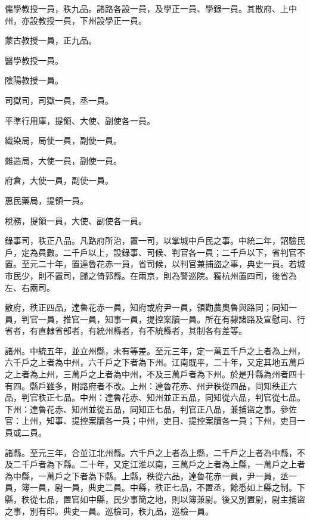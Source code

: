 \begin{pinyinscope}
 儒學教授一員，秩九品。諸路各設一員，及學正一員、學錄一員。其散府、上中州，亦設教授一員，下州設學正一員。



 蒙古教授一員，正九品。



 醫學教授一員。



 陰陽教授一員。



 司獄司，司獄一員，丞一員。



 平準行用庫，提領、大使、副使各一員。



 織染局，局使一員，副使一員。



 雜造局，大使一員，副使一員。



 府倉，大使一員，副使一員。



 惠民藥局，提領一員。



 稅務，提領一員，大使、副使各一員。



 錄事司，秩正八品。凡路府所治，置一司，以掌城中戶民之事。中統二年，詔驗民戶，定為員數。二千戶以上，設錄事、司候、判官各一員；二千戶以下，省判官不置。至元二十年，置達魯花赤一員，省司候，以判官兼捕盜之事，典史一員。若城市民少，則不置司，歸之倚郭縣。在兩京，則為警巡院。獨杭州置四司，後省為左、右兩司。



 散府，秩正四品，達魯花赤一員，知府或府尹一員，領勸農奧魯與路同；同知一員，判官一員，推官一員，知事一員，提控案牘一員。所在有隸諸路及宣慰司、行省者，有直隸省部者，有統州縣者，有不統縣者，其制各有差等。



 諸州。中統五年，並立州縣，未有等差。至元三年，定一萬五千戶之上者為上州，六千戶之上者為中州，六千戶之下者為下州。江南既平，二十年，又定其地五萬戶之上者為上州，三萬戶之上者為中州，不及三萬戶者為下州。於是升縣為州者四十有四。縣戶雖多，附路府者不改。上州：達魯花赤、州尹秩從四品，同知秩正六品，判官秩正七品。中州：達魯花赤、知州並正五品，同知從六品，判官從七品。下州：達魯花赤、知州並從五品，同知正七品，判官正八品，兼捕盜之事。參佐官：上州，知事、提控案牘各一員；中州，吏目、提控案牘各一員；下州，吏目一員或二員。



 諸縣。至元三年，合並江北州縣。六千戶之上者為上縣，二千戶之上者為中縣，不及二千戶者為下縣。二十年，又定江淮以南，三萬戶之上者為上縣，一萬戶之上者為中縣，一萬戶之下者為下縣。上縣，秩從六品，達魯花赤一員，尹一員，丞一員，簿一員，尉一員，典史二員。中縣，秩正七品，不置丞，餘悉如上縣之制。下縣，秩從七品，置官如中縣，民少事簡之地，則以簿兼尉。後又別置尉，尉主捕盜之事，別有印。典史一員。巡檢司，秩九品，巡檢一員。




\end{pinyinscope}
